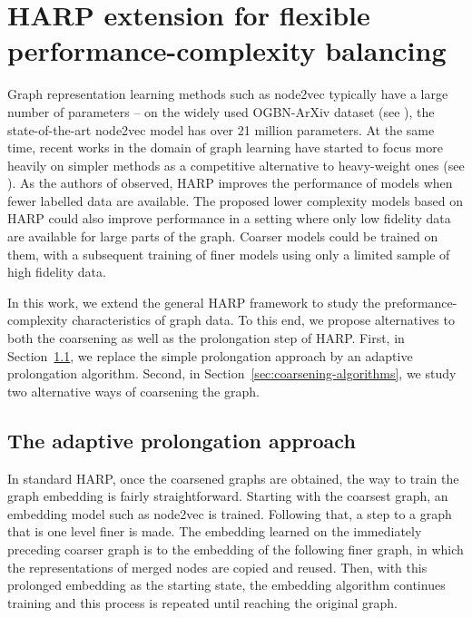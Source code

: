 \section{HARP extension for flexible performance-complexity balancing}\label{sec:our-method}

Graph representation learning methods such as node2vec typically have a large number of parameters -- on the widely used OGBN-ArXiv dataset (see \cite{hu_open_2021}), the state-of-the-art node2vec model has over 21 million parameters. At the same time, recent works in the domain of graph learning have started to focus more heavily on simpler methods as a competitive alternative to heavy-weight ones (see \cite{frasca_sign_2020, huang_combining_2020}). As the authors of \cite{chen_harp_2018} observed, HARP improves the performance of models when fewer labelled data are available. The proposed lower complexity models based on HARP could also improve performance in a setting where only low fidelity data are available for large parts of the graph. Coarser models could be trained on them, with a subsequent training of finer models using only a limited sample of high fidelity data.

In this work, we extend the general HARP framework to study the preformance-complexity characteristics of graph data. To this end, we propose alternatives to both the coarsening as well as the prolongation step of HARP. First, in Section~\ref{sec:adaptive-prolongation}, we replace the simple prolongation approach by an adaptive prolongation algorithm. Second, in Section~\ref{sec:coarsening-algorithms}, we study two alternative ways of coarsening the graph.

\subsection{The adaptive prolongation approach}\label{sec:adaptive-prolongation}

In standard HARP, once the coarsened graphs are obtained, the way to train the graph embedding is fairly straightforward. Starting with the coarsest graph, an embedding model such as node2vec is trained. Following that, a step to a graph that is one level finer is made. The embedding learned on the immediately preceding coarser graph is  to the embedding of the following finer graph, in which the representations of merged nodes are copied and reused.
 Then, with this prolonged embedding as the starting state, the embedding algorithm continues training and this process is repeated until reaching the original graph.

